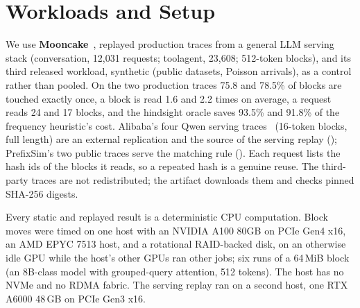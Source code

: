 \section{Workloads and Setup}
\label{sec:sources}
We use \textbf{Mooncake}~\cite{qin2024mooncake}, replayed production traces from a general LLM serving
stack (conversation, 12{,}031 requests; toolagent, 23{,}608; 512-token blocks), and its third released
workload, synthetic (public datasets, Poisson arrivals), as a control rather than pooled. On the two
production traces 75.8 and 78.5\% of blocks are touched exactly once, a block is read 1.6 and 2.2 times on
average, a request reads 24 and 17 blocks, and the hindsight oracle saves 93.5\% and 91.8\% of the frequency
heuristic's cost. Alibaba's four Qwen serving traces~\cite{wang2025kvcachewild} (16-token blocks, full length)
are an external replication and the source of the serving replay (); PrefixSim's two
public traces serve the matching rule (). Each request lists the hash ids of the blocks it
reads, so a repeated hash is a genuine reuse. The third-party traces are not redistributed; the artifact
downloads them and checks pinned SHA-256 digests.

Every static and replayed result is a deterministic CPU computation. Block moves were timed on one host
with an NVIDIA A100 80GB on PCIe Gen4 x16, an AMD EPYC 7513 host, and a rotational RAID-backed disk, on an
otherwise idle GPU while the host's other GPUs ran other jobs; six runs of a 64\,MiB block (an 8B-class
model with grouped-query attention, 512 tokens). The host has no NVMe and no RDMA fabric. The serving replay ran on a second host, one RTX A6000 48\,GB on
PCIe Gen3 x16.

